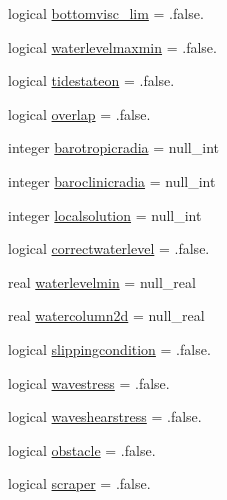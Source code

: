 \begin{DoxyCompactItemize}
logical \mbox{\hyperlink{structmodulehydrodynamic_1_1t__hydrooptions_a1c3eece5c40fdcb15670d2911145297e}{bottomvisc\+\_\+lim}} = .false.
\item 
logical \mbox{\hyperlink{structmodulehydrodynamic_1_1t__hydrooptions_a248d283dc00103eecb15bbb5cc66d05f}{waterlevelmaxmin}} = .false.
\item 
logical \mbox{\hyperlink{structmodulehydrodynamic_1_1t__hydrooptions_a343f33e544f6f3398d5df82fd90da791}{tidestateon}} = .false.
\item 
logical \mbox{\hyperlink{structmodulehydrodynamic_1_1t__hydrooptions_a9ca7806f60b24511bce175123d2f6e72}{overlap}} = .false.
\item 
integer \mbox{\hyperlink{structmodulehydrodynamic_1_1t__hydrooptions_abb40d34be74b4ba70bc567ce34365215}{barotropicradia}} = null\+\_\+int
\item 
integer \mbox{\hyperlink{structmodulehydrodynamic_1_1t__hydrooptions_ad594d3088887e80e09f92156ce45272f}{baroclinicradia}} = null\+\_\+int
\item 
integer \mbox{\hyperlink{structmodulehydrodynamic_1_1t__hydrooptions_abd63629bf0d7f80945a484fbbed5edae}{localsolution}} = null\+\_\+int
\item 
logical \mbox{\hyperlink{structmodulehydrodynamic_1_1t__hydrooptions_a7ca02d2938a2e2c0c1c5abde6fe49041}{correctwaterlevel}} = .false.
\item 
real \mbox{\hyperlink{structmodulehydrodynamic_1_1t__hydrooptions_a1fe54bece720bcf8382c3c477e69a0aa}{waterlevelmin}} = null\+\_\+real
\item 
real \mbox{\hyperlink{structmodulehydrodynamic_1_1t__hydrooptions_af8d92f5acfb1d0b1114c151509d7904d}{watercolumn2d}} = null\+\_\+real
\item 
logical \mbox{\hyperlink{structmodulehydrodynamic_1_1t__hydrooptions_a1943f4c20ecb3942c54d216d95ed4599}{slippingcondition}} = .false.
\item 
logical \mbox{\hyperlink{structmodulehydrodynamic_1_1t__hydrooptions_a75d9a1b46ef0687da9d2786c72550836}{wavestress}} = .false.
\item 
logical \mbox{\hyperlink{structmodulehydrodynamic_1_1t__hydrooptions_a8c7eb73675bfd1e1836fddaf36bea171}{waveshearstress}} = .false.
\item 
logical \mbox{\hyperlink{structmodulehydrodynamic_1_1t__hydrooptions_a39def74d80823c2d7b151a945cf678e9}{obstacle}} = .false.
\item 
logical \mbox{\hyperlink{structmodulehydrodynamic_1_1t__hydrooptions_a2f69700a6a45288cb735328b17ecf6a2}{scraper}} = .false.

\end{DoxyCompactItemize}
